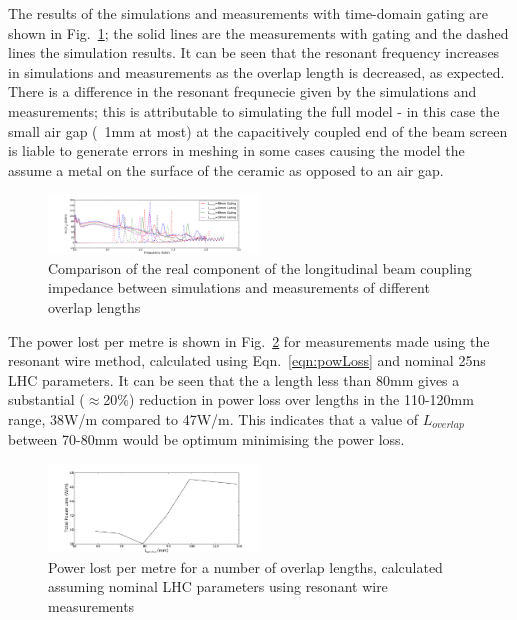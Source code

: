 \documentclass[a4paper,
              ]{jacow}
\begin{document}
The results of the simulations and measurements with time-domain gating are shown in Fig.~\ref{fig:simMeasComp}; the solid lines are the measurements with gating and the dashed lines the simulation results. It can be seen that the resonant frequency increases in simulations and measurements as the overlap length is decreased, as expected. There is a difference in the resonant frequnecie given by the simulations and measurements; this is attributable to simulating the full model - in this case the small air gap (~1mm at most) at the capacitively coupled end of the beam screen is liable to generate errors in meshing in some cases causing the model the assume a metal on the surface of the ceramic as opposed to an air gap.

\begin{figure}
\begin{center}
\includegraphics[width=0.5\textwidth]{simMeasGatingOverlap.pdf}
\caption{Comparison of the real component of the longitudinal beam coupling impedance between simulations and measurements of different overlap lengths}
\label{fig:simMeasComp}
\end{center}
\end{figure}

The power lost per metre is shown in Fig.~\ref{fig:powLossTotal} for measurements made using the resonant wire method, calculated using Eqn.~\ref{eqn:powLoss} and nominal 25ns LHC parameters. It can be seen that the a length less than 80mm gives a substantial ($\approx$20\%) reduction in power loss over lengths in the 110-120mm range, 38W/m compared to 47W/m. This indicates that a value of $L_{overlap}$ between 70-80mm would be optimum minimising the power loss.

\begin{figure}
\begin{center}
\includegraphics[width=0.5\textwidth]{heatingOverlapFull.pdf}
\caption{Power lost per metre for a number of overlap lengths, calculated assuming nominal LHC parameters using resonant wire measurements}
\label{fig:powLossTotal}
\end{center}
\end{figure}
\end{document}
